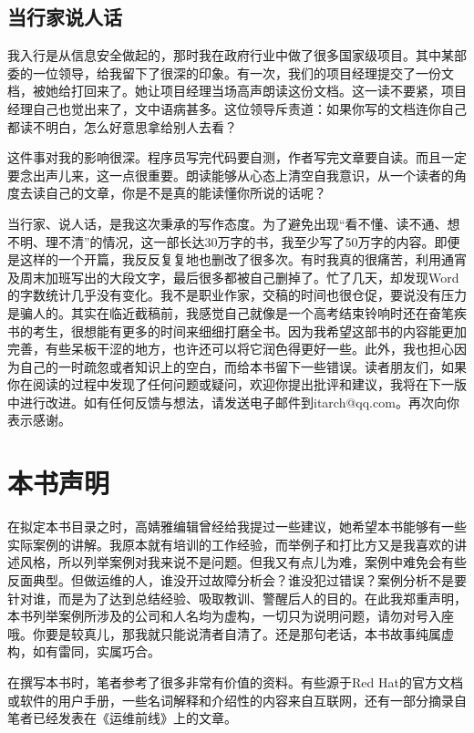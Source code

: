 \documentclass[12pt,UTF8]{ctexbook}
\begin{document}
\subsection{当行家说人话}

我入行是从信息安全做起的，那时我在政府行业中做了很多国家级项目。其中某部委的一位领导，给我留下了很深的印象。有一次，我们的项目经理提交了一份文档，被她给打回来了。她让项目经理当场高声朗读这份文档。这一读不要紧，项目经理自己也觉出来了，文中语病甚多。这位领导斥责道：如果你写的文档连你自己都读不明白，怎么好意思拿给别人去看？

这件事对我的影响很深。程序员写完代码要自测，作者写完文章要自读。而且一定要念出声儿来，这一点很重要。朗读能够从心态上清空自我意识，从一个读者的角度去读自己的文章，你是不是真的能读懂你所说的话呢？

当行家、说人话，是我这次秉承的写作态度。为了避免出现“看不懂、读不通、想不明、理不清”的情况，这一部长达30万字的书，我至少写了50万字的内容。即便是这样的一个开篇，我反反复复地也删改了很多次。有时我真的很痛苦，利用通宵及周末加班写出的大段文字，最后很多都被自己删掉了。忙了几天，却发现Word的字数统计几乎没有变化。我不是职业作家，交稿的时间也很仓促，要说没有压力是骗人的。其实在临近截稿前，我感觉自己就像是一个高考结束铃响时还在奋笔疾书的考生，很想能有更多的时间来细细打磨全书。因为我希望这部书的内容能更加完善，有些呆板干涩的地方，也许还可以将它润色得更好一些。此外，我也担心因为自己的一时疏忽或者知识上的空白，而给本书留下一些错误。读者朋友们，如果你在阅读的过程中发现了任何问题或疑问，欢迎你提出批评和建议，我将在下一版中进行改进。如有任何反馈与想法，请发送电子邮件到itarch@qq.com。再次向你表示感谢。

\section{本书声明}

在拟定本书目录之时，高婧雅编辑曾经给我提过一些建议，她希望本书能够有一些实际案例的讲解。我原本就有培训的工作经验，而举例子和打比方又是我喜欢的讲述风格，所以列举案例对我来说不是问题。但我又有点儿为难，案例中难免会有些反面典型。但做运维的人，谁没开过故障分析会？谁没犯过错误？案例分析不是要针对谁，而是为了达到总结经验、吸取教训、警醒后人的目的。在此我郑重声明，本书列举案例所涉及的公司和人名均为虚构，一切只为说明问题，请勿对号入座哦。你要是较真儿，那我就只能说清者自清了。还是那句老话，本书故事纯属虚构，如有雷同，实属巧合。

在撰写本书时，笔者参考了很多非常有价值的资料。有些源于Red Hat的官方文档或软件的用户手册，一些名词解释和介绍性的内容来自互联网，还有一部分摘录自笔者已经发表在《运维前线》上的文章。
\end{document}
